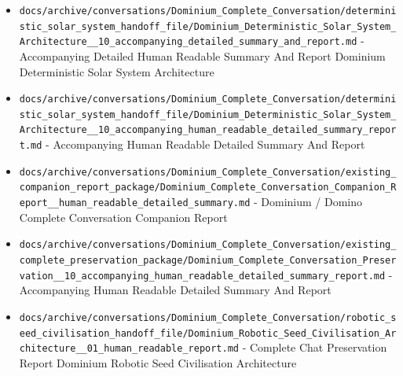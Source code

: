 \documentclass[10.5pt,a4paper,openany]{book}
\begin{document}
\begin{itemize}
\item \texttt{docs/\allowbreak{}archive/\allowbreak{}conversations/\allowbreak{}Dominium\_\allowbreak{}Complete\_\allowbreak{}Conversation/\allowbreak{}deterministic\_\allowbreak{}solar\_\allowbreak{}system\_\allowbreak{}handoff\_\allowbreak{}file/\allowbreak{}Dominium\_\allowbreak{}Deterministic\_\allowbreak{}Solar\_\allowbreak{}System\_\allowbreak{}Architecture\_\allowbreak{}\_\allowbreak{}10\_\allowbreak{}accompanying\_\allowbreak{}detailed\_\allowbreak{}summary\_\allowbreak{}and\_\allowbreak{}report.\allowbreak{}md} -\allowbreak{} Accompanying Detailed Human Readable Summary And Report Dominium Deterministic Solar System Architecture
\item \texttt{docs/\allowbreak{}archive/\allowbreak{}conversations/\allowbreak{}Dominium\_\allowbreak{}Complete\_\allowbreak{}Conversation/\allowbreak{}deterministic\_\allowbreak{}solar\_\allowbreak{}system\_\allowbreak{}handoff\_\allowbreak{}file/\allowbreak{}Dominium\_\allowbreak{}Deterministic\_\allowbreak{}Solar\_\allowbreak{}System\_\allowbreak{}Architecture\_\allowbreak{}\_\allowbreak{}10\_\allowbreak{}accompanying\_\allowbreak{}human\_\allowbreak{}readable\_\allowbreak{}detailed\_\allowbreak{}summary\_\allowbreak{}report.\allowbreak{}md} -\allowbreak{} Accompanying Human Readable Detailed Summary And Report
\item \texttt{docs/\allowbreak{}archive/\allowbreak{}conversations/\allowbreak{}Dominium\_\allowbreak{}Complete\_\allowbreak{}Conversation/\allowbreak{}existing\_\allowbreak{}companion\_\allowbreak{}report\_\allowbreak{}package/\allowbreak{}Dominium\_\allowbreak{}Complete\_\allowbreak{}Conversation\_\allowbreak{}Companion\_\allowbreak{}Report\_\allowbreak{}\_\allowbreak{}human\_\allowbreak{}readable\_\allowbreak{}detailed\_\allowbreak{}summary.\allowbreak{}md} -\allowbreak{} Dominium /\allowbreak{} Domino Complete Conversation Companion Report
\item \texttt{docs/\allowbreak{}archive/\allowbreak{}conversations/\allowbreak{}Dominium\_\allowbreak{}Complete\_\allowbreak{}Conversation/\allowbreak{}existing\_\allowbreak{}complete\_\allowbreak{}preservation\_\allowbreak{}package/\allowbreak{}Dominium\_\allowbreak{}Complete\_\allowbreak{}Conversation\_\allowbreak{}Preservation\_\allowbreak{}\_\allowbreak{}10\_\allowbreak{}accompanying\_\allowbreak{}human\_\allowbreak{}readable\_\allowbreak{}detailed\_\allowbreak{}summary\_\allowbreak{}report.\allowbreak{}md} -\allowbreak{} Accompanying Human Readable Detailed Summary And Report
\item \texttt{docs/\allowbreak{}archive/\allowbreak{}conversations/\allowbreak{}Dominium\_\allowbreak{}Complete\_\allowbreak{}Conversation/\allowbreak{}robotic\_\allowbreak{}seed\_\allowbreak{}civilisation\_\allowbreak{}handoff\_\allowbreak{}file/\allowbreak{}Dominium\_\allowbreak{}Robotic\_\allowbreak{}Seed\_\allowbreak{}Civilisation\_\allowbreak{}Architecture\_\allowbreak{}\_\allowbreak{}01\_\allowbreak{}human\_\allowbreak{}readable\_\allowbreak{}report.\allowbreak{}md} -\allowbreak{} Complete Chat Preservation Report Dominium Robotic Seed Civilisation Architecture

\end{itemize}
\end{document}
